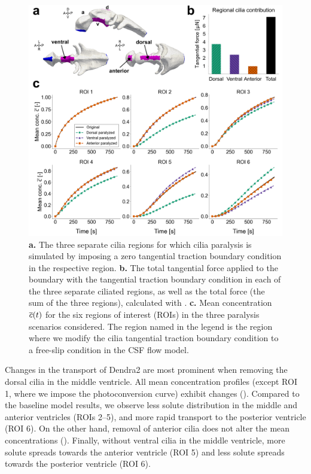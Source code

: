 \documentclass{WileyMSP-template}
\begin{document}
\begin{figure}[H]
    \centering
    \includegraphics[width=\textwidth]{graphics/figure5_compare_cilia_modifications.png}
    \caption{\textbf{a.} The three separate cilia regions for which cilia paralysis is simulated
    by imposing a zero tangential traction boundary condition in the respective region.
    \textbf{b.} The total tangential force applied to the boundary with the tangential traction
    boundary condition in each of the three separate ciliated regions, as well as the total force
    (the sum of the three regions), calculated with . 
    \textbf{c.} Mean concentration $\overline{c}(t)$ for the six regions of interest (ROIs) in the three 
    paralysis scenarios considered. The region named in the legend is the region
    where we modify the cilia tangential traction boundary condition to a free-slip condition
    in the CSF flow model.}
    \label{fig:fig5}
\end{figure}

Changes in the transport of Dendra2 are most prominent when removing the dorsal cilia
in the middle ventricle. All mean concentration profiles 
(except ROI 1, where we impose the photoconversion curve)
exhibit changes ().
Compared to the baseline model results, we observe less solute distribution
in the middle and anterior ventricles (ROIs 2--5),
and more rapid transport to the posterior ventricle (ROI 6).
On the other hand, removal of anterior cilia does not alter the 
mean concentrations ().
Finally, without ventral cilia in the middle ventricle,
more solute spreads towards the anterior ventricle (ROI 5) and
less solute spreads towards the posterior ventricle (ROI 6).
\end{document}
